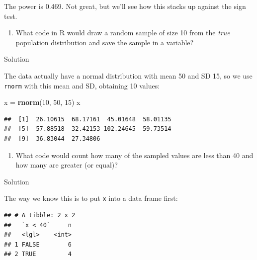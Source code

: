 \documentclass[]{tufte-book}
\newenvironment{Shaded}{}{}
\newcommand{\DecValTok}[1]{\textcolor[rgb]{0.25,0.63,0.44}{#1}}
\newcommand{\KeywordTok}[1]{\textcolor[rgb]{0.00,0.44,0.13}{\textbf{#1}}}
\newcommand{\NormalTok}[1]{#1}
\newcommand{\OperatorTok}[1]{\textcolor[rgb]{0.40,0.40,0.40}{#1}}
\newcommand{\StringTok}[1]{\textcolor[rgb]{0.25,0.44,0.63}{#1}}
\providecommand{\tightlist}{%
  \setlength{\itemsep}{0pt}\setlength{\parskip}{0pt}}
\theoremstyle{definition}
\theoremstyle{definition}
\theoremstyle{definition}
\theoremstyle{remark}
\begin{document}
The power is 0.469. Not great, but we'll see how this stacks up against
the sign test.

\begin{enumerate}
\def\labelenumi{(\alph{enumi})}
\setcounter{enumi}{1}
\tightlist
\item
  What code in R would draw a random sample of size 10 from the
  \emph{true} population distribution and save the sample in a variable?
\end{enumerate}

Solution

The data actually have a normal distribution with mean 50 and SD 15, so
we use \texttt{rnorm} with this mean and SD, obtaining 10 values:

\begin{Shaded}
\begin{Highlighting}[]
\NormalTok{x =}\StringTok{ }\KeywordTok{rnorm}\NormalTok{(}\DecValTok{10}\NormalTok{, }\DecValTok{50}\NormalTok{, }\DecValTok{15}\NormalTok{)}
\NormalTok{x}
\end{Highlighting}
\end{Shaded}

\begin{verbatim}
##  [1]  26.10615  68.17161  45.01648  58.01135
##  [5]  57.88518  32.42153 102.24645  59.73514
##  [9]  36.83044  27.34806
\end{verbatim}

\begin{enumerate}
\def\labelenumi{(\alph{enumi})}
\setcounter{enumi}{2}
\tightlist
\item
  What code would count how many of the sampled values are less than 40
  and how many are greater (or equal)?
\end{enumerate}

Solution

The way we know this is to put \texttt{x} into a data frame first:

\begin{Shaded}
\end{Shaded}

\begin{verbatim}
## # A tibble: 2 x 2
##   `x < 40`     n
##   <lgl>    <int>
## 1 FALSE        6
## 2 TRUE         4
\end{verbatim}
\end{document}
